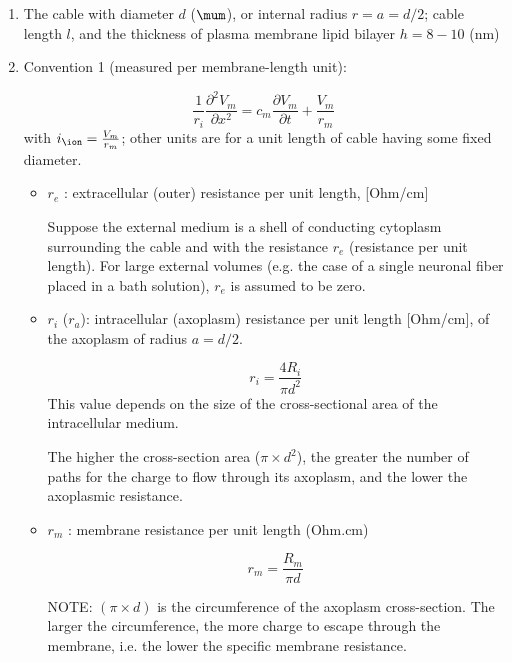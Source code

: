 \begin{enumerate}
  \item The cable with diameter $d$ ($\mum$), or internal radius $r=a=d/2$;
  cable length $l$, and the thickness of plasma membrane lipid bilayer 
  $h=8-10$
  (nm)
  
  \item Convention 1 (measured per membrane-length unit):
  
  \begin{equation}
  \frac{1}{r_i}\frac{\partial^2 V_m}{\partial x^2} = c_m \frac{\partial
  V_m}{\partial t} + \frac{V_m}{r_m}
  \end{equation}
  with $i_\ion = \frac{V_m}{r_m}$; other units are for a unit length of cable
  having some fixed diameter.
  
  \begin{itemize}
    \item $r_e$ : extracellular (outer) resistance per unit length, [Ohm/cm]

  Suppose the external medium is a shell of conducting cytoplasm surrounding the
  cable and with the resistance $r_e$ (resistance per unit length).
  For large external volumes (e.g. the case of a single neuronal fiber placed
  in a bath solution), $r_e$ is assumed to be zero. 

    \item $r_i$ ($r_a$): intracellular (axoplasm) resistance per unit length
    [Ohm/cm], of the axoplasm of radius $a=d/2$.

\begin{equation}
r_i = \frac{4 R_i}{\pi d^2}
\end{equation}
This value depends on the size of the cross-sectional area of the intracellular
medium.

The higher the cross-section area ($\pi \times d^2$), the greater the number of
paths for the charge to flow through its axoplasm, and the lower the axoplasmic
resistance.

    \item $r_m$ : %
    membrane resistance per unit length (Ohm.cm)

\begin{equation}
r_m = \frac{R_m}{\pi d}
\end{equation}

NOTE: $(\pi \times d)$ is the circumference of the axoplasm cross-section. The
larger the circumference, the more charge to escape through the membrane, i.e.
the lower the specific membrane resistance.


\end{itemize}
\end{enumerate}
